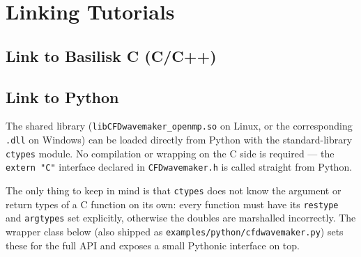 \documentclass{ol-softwaremanual}
\begin{document}


\section{Linking Tutorials}
\subsection{Link to Basilisk C (C/C++)}
\subsection{Link to Python}
The shared library (\texttt{libCFDwavemaker\_openmp.so} on Linux, or the corresponding \texttt{.dll} on Windows) can be loaded directly from Python with the standard-library \texttt{ctypes} module. No compilation or wrapping on the C side is required --- the \texttt{extern "C"} interface declared in \texttt{CFDwavemaker.h} is called straight from Python.

The only thing to keep in mind is that \texttt{ctypes} does not know the argument or return types of a C function on its own: every function must have its \texttt{restype} and \texttt{argtypes} set explicitly, otherwise the doubles are marshalled incorrectly. The wrapper class below (also shipped as \texttt{examples/python/cfdwavemaker.py}) sets these for the full API and exposes a small Pythonic interface on top.
\end{document}
